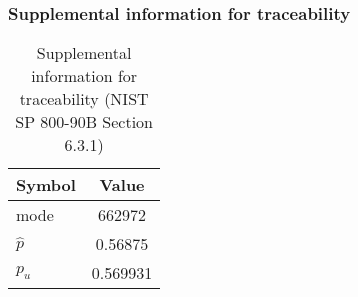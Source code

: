 \documentclass[a3paper,xelatex,english]{bxjsarticle}
\begin{document}
\subsubsection{Supplemental information for traceability}
\renewcommand{\arraystretch}{1.8}
\begin{table}[h]
\caption{Supplemental information for traceability (NIST SP 800-90B Section 6.3.1)}
\begin{center}
\begin{tabular}{|l|c|}
\hline 
\rowcolor{anotherlightblue} %
Symbol				& Value \\ \hline 
mode				&   662972\\ \hline 
$\hat{p}$ 			&  0.56875\\ \hline
$p_u$				& 0.569931\\ \hline
\end{tabular}
\end{center}
\end{table}
\renewcommand{\arraystretch}{1.4}
\clearpage
\end{document}
